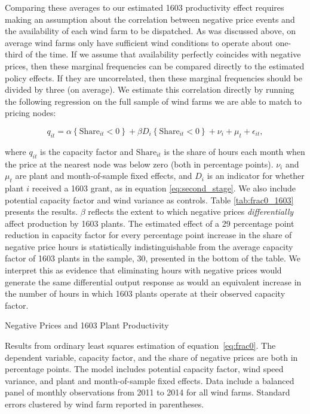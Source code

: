 \documentclass[12pt]{article}
\begin{document}
Comparing these averages to our estimated 1603 productivity effect requires making an assumption about the correlation between negative price events and the availability of each wind farm to be dispatched. As was discussed above, on average wind farms only have sufficient wind conditions to operate about one-third of the time. If we assume that availability perfectly coincides with negative prices, then these marginal frequencies can be compared directly to the estimated policy effects. If they are uncorrelated, then these marginal frequencies should be divided by three (on average). We estimate this correlation directly by running the following regression on the full sample of wind farms we are able to match to pricing nodes: 

\begin{equation}
    q_{it}=\alpha \left\{ \mbox{Share}_{it} < 0 \right\} + \beta D_{i} \left\{ \mbox{Share}_{it} < 0 \right\} + \nu_i + \mu_t +\epsilon_{it}\label{eq:frac0} ,
\end{equation}

\noindent where $q_{it}$ is the capacity factor and $\mbox{Share}_{it}$ is the share of hours each month when the price at the nearest node was below zero (both in percentage points). $\nu_i$ and $\mu_t$ are plant and month-of-sample fixed effects, and $D_i$ is an indicator for whether plant $i$ received a 1603 grant, as in equation \ref{eq:second_stage}. We also include potential capacity factor and wind variance as controls. Table \ref{tab:frac0_1603} presents the results. $\beta$ reflects the extent to which negative prices \textit{differentially} affect production by 1603 plants. The estimated effect of a 29 percentage point reduction in capacity factor for every percentage point increase in the share of negative price hours is statistically indistinguishable from the average capacity factor of 1603 plants in the sample, 30, presented in the bottom of the table. We interpret this as evidence that eliminating hours with negative prices would generate the same differential output response as would an equivalent increase in the number of hours in which 1603 plants operate at their observed capacity factor.

\begin{table}[h]
    \caption{Negative Prices and 1603 Plant Productivity \label{tab:frac0_1603}}
    \begin{center} {\footnotesize{}} \end{center}
    \footnotesize
    
    Results from ordinary least squares estimation of equation~\ref{eq:frac0}. The dependent variable, capacity factor, and the share of negative prices are both in percentage points. The model includes potential capacity factor, wind speed variance, and plant and month-of-sample fixed effects. Data include a balanced panel of monthly observations from 2011 to 2014 for all wind farms. Standard errors clustered by wind farm reported in parentheses.
\end{table}
\end{document}
